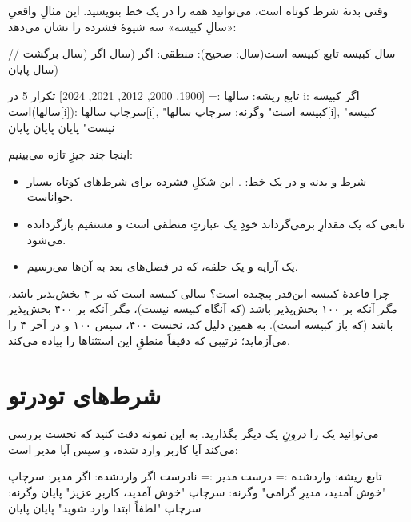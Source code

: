 وقتی بدنهٔ شرط کوتاه است، می‌توانید همه را در یک خط بنویسید. این مثالِ واقعیِ
«سالِ کبیسه» سه شیوهٔ فشرده را نشان می‌دهد:

\begin{salamfa}
// سال کبیسه
تابع کبیسه است(سال: صحیح): منطقی:
    اگر (سال %
    اگر (سال %
    برگشت (سال %
پایان

تابع ریشه:
    سالها := [1900, 2000, 2012, 2021, 2024]
    تکرار 5 در i:
        اگر کبیسه است(سالها[i]): سرچاپ سالها[i], "کبیسه است"
        وگرنه:                    سرچاپ سالها[i], "کبیسه نیست"
        پایان
    پایان
پایان
\end{salamfa}

اینجا چند چیزِ تازه می‌بینیم:
\begin{itemize}
  \item شرط و بدنه و  در یک خط: . این شکلِ فشرده برای شرط‌های کوتاه بسیار خواناست.
  \item تابعی که یک مقدارِ  برمی‌گرداند خودِ
         یک عبارتِ منطقی است و مستقیم بازگردانده می‌شود.
  \item یک آرایه و یک حلقه، که در فصل‌های بعد به آن‌ها می‌رسیم.
\end{itemize}

\begin{deep}
چرا قاعدهٔ کبیسه این‌قدر پیچیده است؟ سالی کبیسه است که بر ۴ بخش‌پذیر باشد،
\emph{مگر} آنکه بر ۱۰۰ بخش‌پذیر باشد (که آنگاه کبیسه نیست)، \emph{مگر} آنکه بر
۴۰۰ بخش‌پذیر باشد (که باز کبیسه است). به همین دلیل کد، نخست ۴۰۰، سپس ۱۰۰ و در
آخر ۴ را می‌آزماید؛ ترتیبی که دقیقاً منطقِ این استثناها را پیاده می‌کند.
\end{deep}

\section{شرط‌های تودرتو}

می‌توانید یک  را \emph{درونِ} یک  دیگر بگذارید. به این
نمونه دقت کنید که نخست بررسی می‌کند آیا کاربر وارد شده، و سپس آیا مدیر است:

\begin{salamfa}
تابع ریشه:
    واردشده := درست
    مدیر := نادرست
    اگر واردشده:
        اگر مدیر:
            سرچاپ "خوش آمدید، مدیرِ گرامی"
        وگرنه:
            سرچاپ "خوش آمدید، کاربرِ عزیز"
        پایان
    وگرنه:
        سرچاپ "لطفاً ابتدا وارد شوید"
    پایان
پایان
\end{salamfa}

